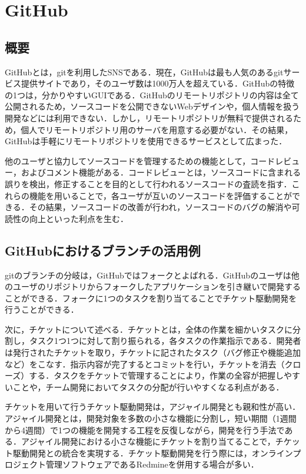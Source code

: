 \documentclass[a4j,9pt,twocolumn]{jsarticle}
\begin{document}
\section{GitHub}
\subsection{概要}
GitHubとは，gitを利用したSNSである．現在，GitHubは最も人気のあるgitサービス提供サイトであり，そのユーザ数は1000万人を超えている\cite{github}．GitHubの特徴の1つは，分かりやすいGUIである．GitHubのリモートリポジトリの内容は全て公開されるため，ソースコードを公開できないWebデザインや，個人情報を扱う開発などには利用できない．しかし，リモートリポジトリが無料で提供されるため，個人でリモートリポジトリ用のサーバを用意する必要がない．その結果，GitHubは手軽にリモートリポジトリを使用できるサービスとして広まった．

他のユーザと協力してソースコードを管理するための機能として，コードレビュー，およびコメント機能がある．コードレビューとは，ソースコードに含まれる誤りを検出，修正することを目的として行われるソースコードの査読を指す．これらの機能を用いることで，各ユーザが互いのソースコードを評価することができる．その結果，ソースコードの改善が行われ，ソースコードのバグの解消や可読性の向上といった利点を生む．

\subsection{GitHubにおけるブランチの活用例}
gitのブランチの分岐は，GitHubではフォークとよばれる．GitHubのユーザは他のユーザのリポジトリからフォークしたアプリケーションを引き継いで開発することができる．フォークに1つのタスクを割り当てることでチケット駆動開発を行うことができる．

次に，チケットについて述べる．チケットとは，全体の作業を細かいタスクに分割し，タスク1つ1つに対して割り振られる，各タスクの作業指示である．開発者は発行されたチケットを取り，チケットに記されたタスク（バグ修正や機能追加など）をこなす．指示内容が完了するとコミットを行い，チケットを消去（クローズ）する．タスクをチケットで管理することにより，作業の全容が把握しやすいことや，チーム開発においてタスクの分配が行いやすくなる利点がある．

チケットを用いて行うチケット駆動開発は，アジャイル開発とも親和性が高い．アジャイル開発とは，開発対象を多数の小さな機能に分割し，短い期間（1週間から4週間）で1つの機能を開発する工程を反復しながら，開発を行う手法である．アジャイル開発における小さな機能にチケットを割り当てることで，チケット駆動開発との統合を実現する．チケット駆動開発を行う際には，オンラインプロジェクト管理ソフトウェアであるRedmineを併用する場合が多い．
\end{document}

